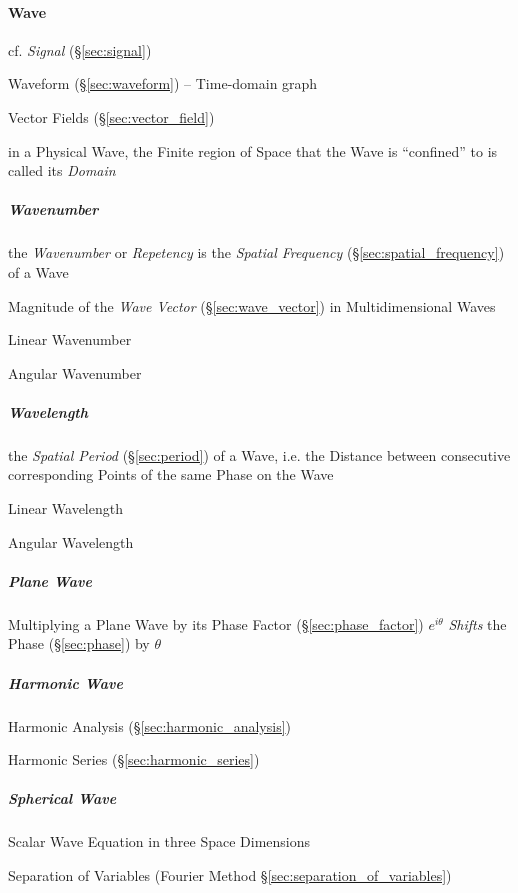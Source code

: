 {\paragraph{Wave}\label{sec:wave}\hfill

\fist cf. \emph{Signal} (\S\ref{sec:signal})

\fist Waveform (\S\ref{sec:waveform}) -- Time-domain graph

\fist Vector Fields (\S\ref{sec:vector_field})

in a Physical Wave, the Finite region of Space that the Wave is ``confined'' to
is called its \emph{Domain}



\subparagraph{Wavenumber}\label{sec:wavenumber}\hfill

the \emph{Wavenumber} or \emph{Repetency} is the \emph{Spatial Frequency}
(\S\ref{sec:spatial_frequency}) of a Wave

Magnitude of the \emph{Wave Vector} (\S\ref{sec:wave_vector}) in
Multidimensional Waves

Linear Wavenumber

Angular Wavenumber



\subparagraph{Wavelength}\label{sec:wavelength}\hfill

the \emph{Spatial Period} (\S\ref{sec:period}) of a Wave, i.e. the Distance
between consecutive corresponding Points of the same Phase on the Wave

Linear Wavelength

Angular Wavelength



\subparagraph{Plane Wave}\label{sec:plane_wave}\hfill

Multiplying a Plane Wave by its Phase Factor (\S\ref{sec:phase_factor})
$e^{i\theta}$ \emph{Shifts} the Phase (\S\ref{sec:phase}) by $\theta$



\subparagraph{Harmonic Wave}\label{sec:harmonic_wave}\hfill

\fist Harmonic Analysis (\S\ref{sec:harmonic_analysis})

\fist Harmonic Series (\S\ref{sec:harmonic_series})



\subparagraph{Spherical Wave}\label{sec:spherical_wave}\hfill

Scalar Wave Equation in three Space Dimensions

Separation of Variables (Fourier Method \S\ref{sec:separation_of_variables})

}
